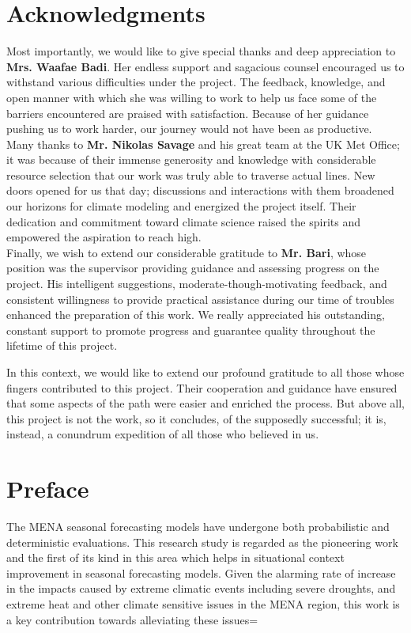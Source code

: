 
\section*{Acknowledgments}
Most importantly, we would like to give special thanks and deep appreciation to \textbf{Mrs. Waafae Badi}. Her endless support and sagacious counsel encouraged us to withstand various difficulties under the project. The feedback, knowledge, and open manner with which she was willing to work to help us face some of the barriers encountered are praised with satisfaction. Because of her guidance pushing us to work harder, our journey would not have been as productive.\\

Many thanks to \textbf{Mr. Nikolas Savage} and his great team at the UK Met Office; it was because of their immense generosity and knowledge with considerable resource selection that our work was truly able to traverse actual lines. New doors opened for us that day; discussions and interactions with them broadened our horizons for climate modeling and energized the project itself. Their dedication and commitment toward climate science raised the spirits and empowered the aspiration to reach high.\\

Finally, we wish to extend our considerable gratitude to \textbf{Mr. Bari}, whose position was the supervisor providing guidance and assessing progress on the project. His intelligent suggestions, moderate-though-motivating feedback, and consistent willingness to provide practical assistance during our time of troubles enhanced the preparation of this work. We really appreciated his outstanding, constant support to promote progress and guarantee quality throughout the lifetime of this project.



In this context, we would like to extend our profound gratitude to all those whose fingers contributed to this project. Their cooperation and guidance have ensured that some aspects of the path were easier and enriched the process. But above all, this project is not the work, so it concludes, of the supposedly successful; it is, instead, a conundrum expedition of all those who believed in us. 
\newpage

\section*{Preface}
The MENA seasonal forecasting models have undergone both probabilistic and deterministic evaluations. This research study is regarded as the pioneering work and the first of its kind in this area which helps in situational context improvement in seasonal forecasting models. Given the alarming rate of increase in the impacts caused by extreme climatic events including severe droughts, and extreme heat and other climate sensitive issues in the MENA region, this work is a key contribution towards alleviating these issues=
\\


